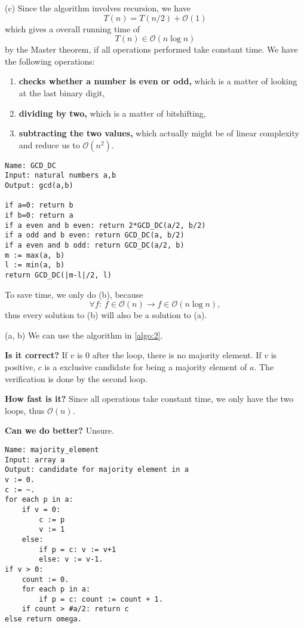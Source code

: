 \documentclass[12pt]{article}
\begin{document}
 (c) Since the algorithm involves recursion, we have \begin{equation}
 	T(n) = T(n/2) + \mathcal{O}(1)
 \end{equation} which gives a overall running time of \begin{equation}
 	T(n)\in\mathcal{O}(n\log n)
 \end{equation} by the Master theorem, if all operations performed take constant time. We have the following operations: \begin{enumerate}
 	\item \textbf{checks whether a number is even or odd,} which is a matter of looking at the last binary digit,
 	\item \textbf{dividing by two,} which is a matter of bitshifting,
 	\item \textbf{subtracting the two values,} which actually might be of linear complexity and reduce us to $\mathcal{O}(n^2)$.
 \end{enumerate}

 
\begin{lstlisting}[caption={Divide and conquer \texttt{gcd}},label={algo:1}]
Name: GCD_DC
Input: natural numbers a,b
Output: gcd(a,b)

if a=0: return b
if b=0: return a
if a even and b even: return 2*GCD_DC(a/2, b/2)
if a odd and b even: return GCD_DC(a, b/2)
if a even and b odd: return GCD_DC(a/2, b)
m := max(a, b)
l := min(a, b)
return GCD_DC(|m-l|/2, l)
\end{lstlisting}

  To save time, we only do (b), because \begin{equation}
 	\forall f:\ f\in\mathcal{O}(n)\rightarrow f\in\mathcal{O}(n\log n),
 \end{equation} thus every solution to (b) will also be a solution to (a).
 
 (a, b) We can use the algorithm in \autoref{algo:2}.
 
 \textbf{Is it correct?} If $v$ is 0 after the loop, there is no majority element. If $v$ is positive, $c$ is a exclusive candidate for being a majority element of $a$. The verification is done by the second loop.
 
 \textbf{How fast is it?} Since all operations take constant time, we only have the two loops, thus $\mathcal{O}(n)$.
 
 \textbf{Can we do better?} Unsure.
 
\begin{lstlisting}[caption={Finding majority elment in an array},label={algo:2}]
Name: majority_element
Input: array a
Output: candidate for majority element in a
v := 0.
c := ~.
for each p in a:
	if v = 0:
		c := p
		v := 1
	else:
		if p = c: v := v+1
		else: v := v-1.
if v > 0:
	count := 0.
	for each p in a:
		if p = c: count := count + 1.
	if count > #a/2: return c
else return omega.	
\end{lstlisting}
\end{document}
